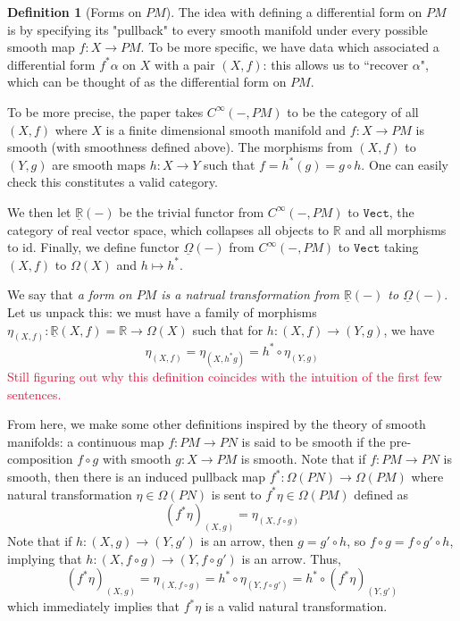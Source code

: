 \documentclass[aps,pra,showpacs,notitlepage,onecolumn,superscriptaddress,nofootinbib]{revtex4-1}
\newcommand{\pop}[1]{\textcolor{crimson}{#1}}
\theoremstyle{definition}
\newtheorem{definition}{Definition}[section]
\begin{document}
\begin{definition}[Forms on $PM$]
    The idea with defining a differential form on $PM$ is by specifying its "pullback" to every smooth manifold under every possible smooth map $f : X \rightarrow PM$.
    To be more specific, we have data which associated a differential form $f^{*} \alpha$ on $X$ with a pair $(X, f)$: this allows us to ``recover $\alpha$", which can be thought 
    of as the differential form on $PM$.

    To be more precise, the paper takes $C^{\infty}(-, PM)$ to be the category of all $(X, f)$ where $X$ is a finite dimensional smooth manifold and $f : X \rightarrow PM$ is smooth (with 
    smoothness defined above). The morphisms from $(X, f)$ to $(Y, g)$ are smooth maps $h : X \rightarrow Y$ such that $f = h^{*}(g) = g \circ h$. One can easily check 
    this constitutes a valid category.

    We then let $\underline{\mathbb{R}}(-)$ be the trivial functor from $C^{\infty}(-, PM)$ to $\texttt{Vect}$, the category of real vector space, which collapses 
    all objects to $\mathbb{R}$ and all morphisms to $\text{id}$. Finally, we define functor $\underline{\Omega}(-)$ from $C^{\infty}(-, PM)$ to $\texttt{Vect}$ 
    taking $(X, f)$ to $\Omega(X)$ and $h \mapsto h^{*}$.

    We say that \emph{a form on $PM$ is a natrual transformation from $\underline{\mathbb{R}}(-)$ to $\underline{\Omega}(-)$}. Let us unpack this: we must have
    a family of morphisms $\eta_{(X, f)} : \underline{\mathbb{R}}(X, f) = \mathbb{R} \rightarrow \Omega(X)$ such that for $h : (X, f) \rightarrow (Y, g)$, we have
    \begin{equation}
        \eta_{(X, f)} = \eta_{(X, h^{*} g)} = h^{*} \circ \eta_{(Y, g)}
    \end{equation}
    \pop{Still figuring out why this definition coincides with the intuition of the first few sentences.}
\end{definition}

\noindent From here, we make some other definitions inspired by the theory of smooth manifolds: a continuous map $f : PM \rightarrow PN$ is said to be smooth 
if the pre-composition $f \circ g$ with smooth $g : X \rightarrow PM$ is smooth. Note that if $f : PM \rightarrow PN$ is smooth, then there is an induced 
pullback map $f^{*} : \Omega(PN) \rightarrow \Omega(PM)$ where natural transformation $\eta \in \Omega(PN)$ is sent to $f^{*} \eta \in \Omega(PM)$ defined as 
\begin{equation}
    (f^{*} \eta)_{(X, g)} = \eta_{(X, f \circ g)}
\end{equation}
Note that if $h : (X, g) \rightarrow (Y, g')$ is an arrow, then $g = g' \circ h$, so $f \circ g = f \circ g' \circ h$, implying that $h : (X, f \circ g) \rightarrow (Y, f \circ g')$ is an arrow. Thus,
\begin{equation}
    (f^{*} \eta)_{(X, g)} = \eta_{(X, f \circ g)} = h^{*} \circ \eta_{(Y, f \circ g')} = h^{*} \circ (f^{*} \eta)_{(Y, g')}
\end{equation}
which immediately implies that $f^{*} \eta$ is a valid natural transformation.
\end{document}
